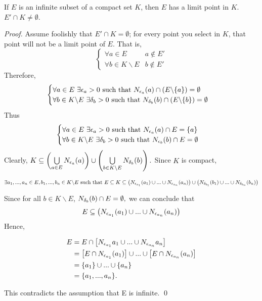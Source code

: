 	\begin{theorem}
		If $E$ is an infinite subset of a compact set $K$, then $E$ has a limit point in $K$. $E'\cap K \not = \emptyset$.
	\end{theorem}
	
	\begin{proof}
		Assume foolishly that $E'\cap K = \emptyset$; for every point you select in $K$, that point will not be a limit point of $E$. That is,
		$$
		\begin{cases}
			\forall a \in E &a\not \in E' \\
			\forall b \in K \backslash E &b\not \in E'
		\end{cases}
		$$
		Therefore,
		$$
		\begin{cases}
			\forall a \in E ~\exists \epsilon_a > 0 \text{ such that } N_{\epsilon_a}(a)\cap (E \backslash \{a\})=\emptyset \\
			\forall b \in K \backslash E ~\exists \delta_b > 0 \text{ such that } N_{\delta_b}(b)\cap (E \backslash \{b\})=\emptyset \\
		\end{cases}
		$$
		Thus
		$$
		\begin{cases}
			\forall a \in E ~\exists \epsilon_a > 0 \text{ such that } N_{\epsilon_a}(a)\cap E = \{a\} \\
			\forall b \in K \backslash E ~\exists \delta_b > 0 \text{ such that } N_{\epsilon_b}(b)\cap E = \emptyset
		\end{cases}
		$$
		Clearly, $K \subseteq \left( \bigcup \limits_{a\in E} N_{\epsilon_a}(a)
		\right) \cup \left( \bigcup \limits_{b\in K\backslash E} N_{\delta_b}(b)\right).$ Since $K$ is compact,
		
		$$\exists a_1,...,a_n \in E, b_1,...,b_n \in K \backslash E \text{ such that } \\ E \subseteq K \subseteq \left(N_{\epsilon_{a_1}}(a_1)\cup...\cup N_{\epsilon_{a_n}}(a_n)\right)\cup \left(N_{\delta_{b_1}}(b_1)\cup...\cup N_{\delta_{b_n}}(b_n)\right) $$
		
		Since for all $b\in K \backslash E$, $N_{\delta_b}(b)\cap E = \emptyset,$ we can conclude that
		$$E \subseteq \left( N_{\epsilon_{a_1}}(a_1) \cup...\cup N_{\epsilon_{a_n}}(a_n) \right)$$
		Hence, 
		
		\begin{align*}
			E &= E \cap \left[ N_{\epsilon_{a_1}}a_1 \cup ... \cup N_{\epsilon_{a_n}}a_n \right] \\
				&= \left [E\cap N_{\epsilon_{a_1}}(a_1) \right] \cup ... \cup \left[ E \cap N_{\epsilon_{a_n}}(a_n)\right] \\
				&= \{a_1\} \cup ... \cup \{a_n\} \\
				&= \{a_1,...,a_n\}.
		\end{align*}
		
		This contradicts the assumption that E is infinite. \qed
	\end{proof}
	
